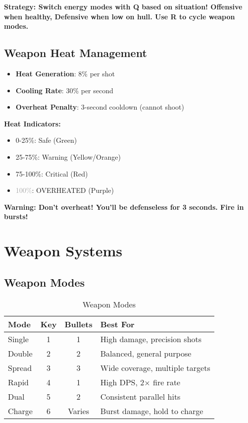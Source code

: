 \documentclass[11pt,a4paper]{article}
\newcommand{\infobox}[2]{%
    \vspace{0.3cm}
    \noindent\colorbox{#1!10}{%
        \parbox{\dimexpr\textwidth-2\fboxsep}{%
            \textcolor{#1}{\textbf{#2}}
        }
    }
    \vspace{0.3cm}
}
\begin{document}
\infobox{successcolor}{\textbf{Strategy:} Switch energy modes with \textbf{Q} based on situation! Offensive when healthy, Defensive when low on hull. Use \textbf{R} to cycle weapon modes.}

\subsection{Weapon Heat Management}

\begin{itemize}
    \item \textbf{Heat Generation}: 8\% per shot
    \item \textbf{Cooling Rate}: 30\% per second
    \item \textbf{Overheat Penalty}: 3-second cooldown (cannot shoot)
\end{itemize}

\textbf{Heat Indicators:}
\begin{itemize}
    \item \textcolor{successcolor}{0-25\%}: Safe (Green)
    \item \textcolor{infocolor}{25-75\%}: Warning (Yellow/Orange)
    \item \textcolor{warningcolor}{75-100\%}: Critical (Red)
    \item \textcolor{darkgray}{100\%}: OVERHEATED (Purple)
\end{itemize}

\infobox{warningcolor}{\textbf{Warning:} Don't overheat! You'll be defenseless for 3 seconds. Fire in bursts!}

\section{Weapon Systems}

\subsection{Weapon Modes}

\begin{table}[h]
\centering
\small
\begin{tabularx}{\textwidth}{|l|c|c|X|}
\hline
\rowcolor{primarycolor!20}
\textbf{Mode} & \textbf{Key} & \textbf{Bullets} & \textbf{Best For} \\
\hline
Single & 1 & 1 & High damage, precision shots \\
\hline
Double & 2 & 2 & Balanced, general purpose \\
\hline
Spread & 3 & 3 & Wide coverage, multiple targets \\
\hline
Rapid & 4 & 1 & High DPS, 2× fire rate \\
\hline
Dual & 5 & 2 & Consistent parallel hits \\
\hline
Charge & 6 & Varies & Burst damage, hold to charge \\
\hline
\end{tabularx}
\caption{Weapon Modes}
\end{table}
\end{document}
